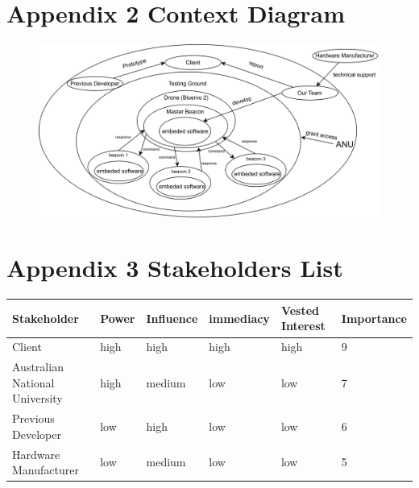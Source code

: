 \documentclass{article}
\begin{document}
\section{Appendix 2 Context Diagram}
\begin{figure}[h]
    \centering
    \includegraphics[scale=0.5]{Context Diagram}
    \label{1-2-a}
\end{figure}
\section{Appendix 3 Stakeholders List}
\begin{center}
\begin{tabular}{ | m{6em} | m{4em} | m{4em} | m{5em} | m{7em} | m{6em} | } 
  \hline
  Stakeholder & Power & Influence & immediacy & Vested Interest & Importance\\ 
  \hline
  Client & high & high & high & high & 9\\
  \hline
  Australian National University & high & medium & low & low & 7\\
  \hline
  Previous Developer & low & high & low & low & 6\\
  \hline
  Hardware Manufacturer & low & medium & low & low & 5\\
  \hline
\end{tabular}
\end{center}
\end{document}
